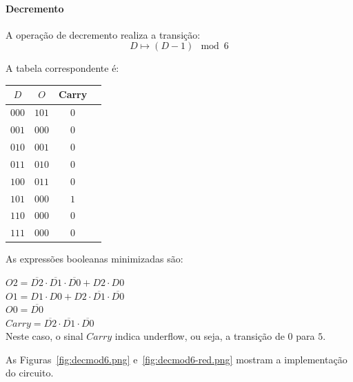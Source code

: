 \paragraph{Decremento}

A operação de decremento realiza a transição:
\[
D \mapsto (D - 1) \mod 6
\]

A tabela correspondente é:

\begin{center}
\begin{tabular}{c|ccc}
$D$ & $O$ & Carry \\
\hline
$000$ & $101$ & $0$ \\
$001$ & $000$ & $0$ \\
$010$ & $001$ & $0$ \\
$011$ & $010$ & $0$ \\
$100$ & $011$ & $0$ \\
$101$ & $000$ & $1$ \\
$110$ & $000$ & $0$ \\
$111$ & $000$ & $0$ \\
\end{tabular}
\end{center}

As expressões booleanas minimizadas são:

$O2 =  \overline{D2}  \cdot  \overline{D1}  \cdot  \overline{D0} +D2 \cdot D0$~\\
$O1 = D1 \cdot D0+D2 \cdot  \overline{D1}  \cdot  \overline{D0} $~\\
$O0 =  \overline{D0} $~\\
$Carry =  \overline{D2}  \cdot  \overline{D1}  \cdot  \overline{D0} $~\\

Neste caso, o sinal $Carry$ indica underflow, ou seja, a transição de $0$ para $5$.

As Figuras~\ref{fig:decmod6.png} e~\ref{fig:decmod6-red.png} mostram a implementação do circuito.

